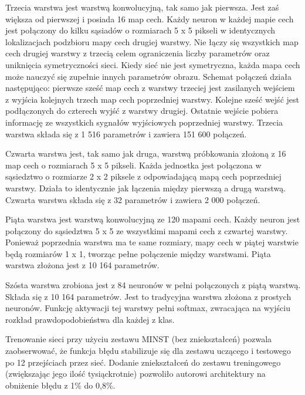 \documentclass[12pt,a4paper,twoside,titlepage,openright]{book}
\begin{document}
\begin{itemize}
\begin{itemize}
Trzecia warstwa jest warstwą konwolucyjną, tak samo jak pierwsza. Jest zaś większa od pierwszej i posiada 16 map cech. Każdy neuron w każdej mapie cech jest połączony do kilku sąsiadów o rozmiarach 5 x 5 pikseli w identycznych lokalizacjach podzbioru mapy cech drugiej warstwy. Nie łączy się wszystkich map cech drugiej warstwy z trzecią celem ograniczenia liczby parametrów oraz uniknięcia symetryczności sieci. Kiedy sieć nie jest symetryczna, każda mapa cech może nauczyć się zupełnie innych parametrów obrazu. Schemat połączeń działa następująco: pierwsze sześć map cech z warstwy trzeciej jest zasilanych wejściem z wyjścia kolejnych trzech map cech poprzedniej warstwy. Kolejne sześć wejść jest podłączonych do czterech wyjść z warstwy drugiej. Ostatnie wejście pobiera informację ze wszystkich sygnałów wyjściowych poprzedniej warstwy. Trzecia warstwa składa się z 1 516 parametrów i zawiera 151 600 połączeń.

Czwarta warstwa jest, tak samo jak druga, warstwą próbkowania złożoną z 16 map cech o rozmiarach 5 x 5 pikseli. Każda jednostka jest połączona w sąsiedztwo o rozmiarze 2 x 2 piksele z odpowiadającą mapą cech poprzedniej warstwy. Działa to identycznie jak łączenia między pierwszą a drugą warstwą. Czwarta warstwa składa się z 32 parametrów i zawiera 2 000 połączeń.

Piąta warstwa jest warstwą konwolucyjną ze 120 mapami cech. Każdy neuron jest połączony do sąsiedztwa 5 x 5 ze wszystkimi mapami cech z czwartej warstwy. Ponieważ poprzednia warstwa ma te same rozmiary, mapy cech w piątej warstwie będą rozmiarów 1 x 1, tworząc pełne połączenie między warstwami. Piąta warstwa złożona jest z 10 164 parametrów.

Szósta warstwa zrobiona jest z 84 neuronów w pełni połączonych z piątą warstwą. Składa się z 10 164 parametrów. Jest to tradycyjna warstwa złożona z prostych neuronów. Funkcję aktywacji tej warstwy pełni softmax, zwracająca na wyjściu rozkład prawdopodobieństwa dla każdej z klas.

Trenowanie sieci przy użyciu zestawu MINST (bez zniekształceń) pozwala zaobserwować, że funkcja błędu stabilizuje się dla zestawu uczącego i testowego po 12 przejściach przez sieć. Dodanie zniekształceń do zestawu treningowego (zwiększając jego ilość tysiąckrotnie) pozwoliło autorowi architektury na obniżenie błędu z 1\% do 0,8\%.


\end{itemize}
\end{itemize}
\end{document}
